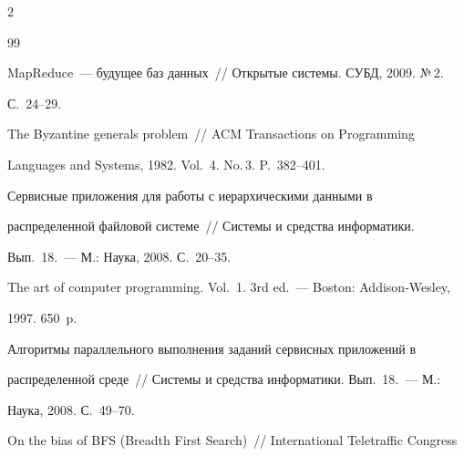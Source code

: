 \begin{multicols}{2}
{{\begin{thebibliography}{99}




MapReduce~--- будущее баз данных~// Открытые системы. СУБД, 2009. №\,2. 


С.~24--29.









The Byzantine generals problem~// ACM Transactions on Programming 


Languages and Systems, 1982. Vol.~4. No.\,3. P.~382--401.









Сервисные приложения для работы с иерархическими данными в 


распределенной файловой системе~// Системы и средства информатики.  


Вып.~18.~--- М.: Наука, 2008. С.~20--35.









The art of computer programming. Vol.~1. 3rd ed.~--- Boston: Addison-Wesley, 


1997. 650~p.









Алгоритмы параллельного выполнения заданий сервисных приложений в 


распределенной среде~// Системы и средства информатики. Вып.~18.~--- М.: 


Наука, 2008. С.~49--70.









On the bias of BFS (Breadth First Search)~// International Teletraffic Congress 



\end{thebibliography}}}
\end{multicols}
